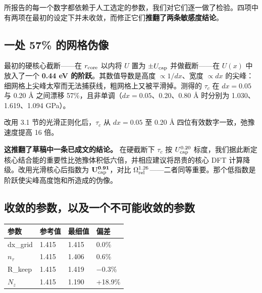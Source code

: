 \documentclass[11pt,a4paper]{article}
\begin{document}
所报告的每一个数字都依赖于人工选定的参数，我们对它们逐一做了检验。四项中有两项在最初的设定下并未收敛，而修正它们\textbf{推翻了两条敏感度结论}。

\hypertarget{ux4e00ux5904-57-ux7684ux7f51ux683cux4f2aux50cf}{%
\subsection{一处 57\% 的网格伪像}\label{sec:ux4e00ux5904-57-ux7684ux7f51ux683cux4f2aux50cf}}

最初的硬核心截断------在 \(r_{\rm core}\) 以内将 \(U\) 置为 \(\pm U_{\rm cap}\) 并做截断------在 \(U(x)\) 中放入了一个 \textbf{0.44 eV 的阶跃}。其数值导数是高度 \(\propto1/dx\)、宽度 \(\propto dx\) 的尖峰：细网格上尖峰太窄而无法捕获线，粗网格上又被平滑掉。测得的 \(\tau_c\) 在 \(dx = 0.05\) 与 0.20 Å 之间漂移 57\%，且非单调（\(dx = 0.05\)、0.20、0.80 Å 时分别为 1.030、1.619、1.094 GPa）。

改用 3.1 节的光滑正则化后，\(\tau_c\) 从 \(dx = 0.05\) 至 0.20 Å 四位有效数字一致，弛豫速度提高 16 倍。

\textbf{这推翻了草稿中一条已成文的结论。} 在硬截断下 \(\tau_c\) 按 \(U_{\rm cap}^{0.20}\) 标度，我们据此断定核心结合能的重要性比弛豫体积低六倍，并相应建议将昂贵的核心 DFT 计算降级。改用光滑核心后指数为 \(\mathbf{U_{\rm cap}^{0.91}}\)，对比 \(\Omega_{\rm rel}^{1.26}\)------二者同等重要。那个低指数是阶跃使尖峰高度饱和所造成的伪像。

\hypertarget{ux6536ux655bux7684ux53c2ux6570ux4ee5ux53caux4e00ux4e2aux4e0dux53efux80fdux6536ux655bux7684ux53c2ux6570}{%
\subsection{收敛的参数，以及一个不可能收敛的参数}\label{sec:ux6536ux655bux7684ux53c2ux6570ux4ee5ux53caux4e00ux4e2aux4e0dux53efux80fdux6536ux655bux7684ux53c2ux6570}}

\begin{longtable}[]{@{}llll@{}}
\toprule\noalign{}
参数 & 参考值 & 最细值 & 偏差 \\
\midrule\noalign{}
\endhead
\bottomrule\noalign{}
\endlastfoot
dx\_grid & 1.415 & 1.415 & 0.0\% \\
\(n_\tau\) & 1.415 & 1.406 & 0.6\% \\
R\_keep & 1.415 & 1.419 & −0.3\% \\
\(N_z\) & 1.415 & 1.190 & +18.9\% \\
\end{longtable}
\end{document}

